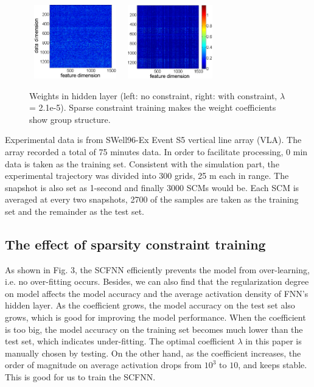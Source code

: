 \begin{figure}
\includegraphics[width=4cm,height=3.2cm]{figure/Weights_summaries_in_hidden_laye_swell_exp}
\includegraphics[width=4cm,height=3.2cm]{figure/Weights_summaries_in_hidden_layer_swell_exp_lambda_2_dot_1e_neg_5}
\caption{Weights in hidden layer (left: no constraint, right: with constraint, $\lambda$ = 2.1e-5). Sparse constraint
training makes the weight coefficients show group structure.}
\end{figure}

Experimental data is from SWell96-Ex Event S5 vertical line array (VLA). The array recorded a total of 75 minutes data. In order to facilitate processing, 0 min data is taken as the training set.
Consistent with the simulation part, the experimental trajectory was divided into 300 grids, 25 m each in range. The snapshot is also set as 1-second and finally 3000 SCMs would be. Each SCM is averaged at every two snapshots, 2700 of the samples are taken as the training set and the remainder as the test set.

\subsection{The effect of sparsity constraint training}
As shown in Fig. 3, the SCFNN efficiently prevents the model from over-learning, i.e. no over-fitting occurs.
Besides, we can also find that the regularization degree on model affects the model accuracy and the average activation density of FNN's hidden layer. As the coefficient grows, the model accuracy on the test set also grows, which is good for improving the model performance.
When the coefficient is too big, the model accuracy on the training set becomes much lower than the test set, which indicates under-fitting.
The optimal coefficient $\lambda$ in this paper is manually chosen by testing.
On the other hand, as the coefficient increases, the order of magnitude on average activation drops from $10^{3}$ to $10$, and keeps stable. This is good for us to train the SCFNN.

